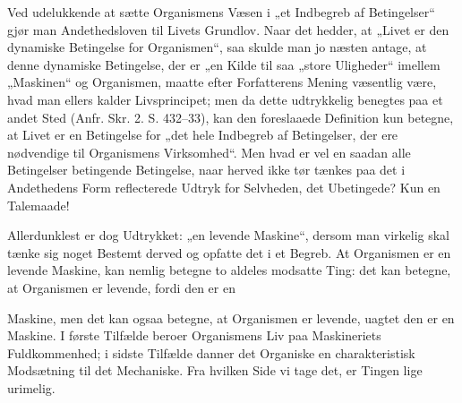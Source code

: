 \documentclass[12pt,a4paper]{book}
\begin{document}
Ved udelukkende at sætte Organismens Væsen i „et Indbegreb af
Betingelser“ gjør man Andethedsloven til Livets Grundlov. Naar det
hedder, at „Livet er den dynamiske Betingelse for Organismen“, saa skulde
man jo næsten antage, at denne dynamiske Betingelse, der er „en Kilde til
saa „store Uligheder“ imellem „Maskinen“ og Organismen, maatte efter
Forfatterens Mening væsentlig være, hvad man ellers kalder Livsprincipet;
men da dette udtrykkelig benegtes paa et andet Sted (Anfr. Skr. 2. S.
432--33), kan den foreslaaede Definition kun betegne, at Livet er en
Betingelse for „det hele Indbegreb af Betingelser, der ere nødvendige til
Organismens Virksomhed“. Men hvad er vel en saadan alle Betingelser
betingende Betingelse, naar herved ikke tør tænkes paa det i Andethedens
Form reflecterede Udtryk for Selvheden, det Ubetingede? Kun en
Talemaade!

Allerdunklest er dog Udtrykket: „en levende Maskine“, dersom man virkelig
skal tænke sig noget Bestemt derved og opfatte det i et Begreb. At
Organismen er en levende Maskine, kan nemlig betegne to aldeles modsatte
Ting: det kan betegne, at Organismen er levende, fordi den er en

\setcounter{footnote}{0}
Maskine, men det kan ogsaa betegne, at Organismen er levende, uagtet den
er en Maskine. I første Tilfælde beroer Organismens Liv paa Maskineriets
Fuldkommenhed; i sidste Tilfælde danner det Organiske en charakteristisk
Modsætning til det Mechaniske. Fra hvilken Side vi tage det, er Tingen
lige urimelig.
\end{document}
